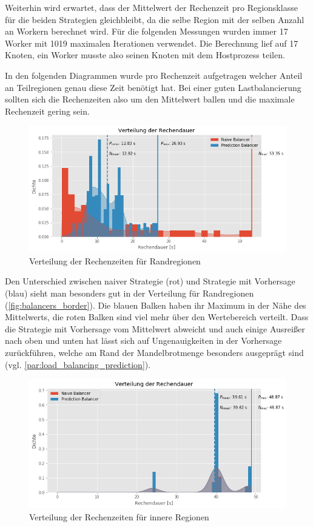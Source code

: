 Weiterhin wird erwartet, dass der Mittelwert der Rechenzeit pro Regionsklasse für die beiden Strategien gleichbleibt, da die selbe Region mit der selben Anzahl an Workern berechnet wird.
Für die folgenden Messungen wurden immer 17 Worker mit 1019 maximalen Iterationen verwendet.
Die Berechnung lief auf 17 Knoten, ein Worker musste also seinen Knoten mit dem Hostprozess teilen.

In den folgenden Diagrammen wurde pro Rechenzeit aufgetragen welcher Anteil an Teilregionen genau diese Zeit benötigt hat.
Bei einer guten Lastbalancierung sollten sich die Rechenzeiten also um den Mittelwert ballen und die maximale Rechenzeit gering sein.

\begin{figure}
	\centering
	\includegraphics[width=0.9\linewidth]{img/Evaluation/balancers/balancers_border.png}
	\caption{Verteilung der Rechenzeiten für Randregionen}
	\label{fig:balancers_border}
\end{figure}

Den Unterschied zwischen naiver Strategie (rot) und Strategie mit Vorhersage (blau) sieht man besonders gut in der Verteilung für Randregionen (\autoref{fig:balancers_border}).
Die blauen Balken haben ihr Maximum in der Nähe des Mittelwerts, die roten Balken sind viel mehr über den Wertebereich verteilt.
Dass die Strategie mit Vorhersage vom Mittelwert abweicht und auch einige Ausreißer nach oben und unten hat lässt sich auf Ungenauigkeiten in der Vorhersage zurückführen, welche am Rand der Mandelbrotmenge besonders ausgeprägt sind (vgl. \autoref{par:load_balancing_prediction}).

\begin{figure}
	\centering
	\includegraphics[width=0.9\linewidth]{img/Evaluation/balancers/balancers_inside.png}
	\caption{Verteilung der Rechenzeiten für innere Regionen}
	\label{fig:balancers_inside}
\end{figure}

